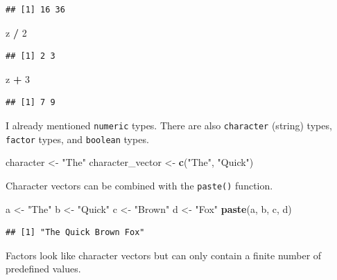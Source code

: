 \documentclass[openany]{book}
\newenvironment{Shaded}{\begin{snugshade}}{\end{snugshade}}
\newcommand{\DecValTok}[1]{\textcolor[rgb]{0.00,0.00,0.81}{#1}}
\newcommand{\KeywordTok}[1]{\textcolor[rgb]{0.13,0.29,0.53}{\textbf{#1}}}
\newcommand{\NormalTok}[1]{#1}
\newcommand{\OperatorTok}[1]{\textcolor[rgb]{0.81,0.36,0.00}{\textbf{#1}}}
\newcommand{\StringTok}[1]{\textcolor[rgb]{0.31,0.60,0.02}{#1}}
\begin{document}
\begin{verbatim}
## [1] 16 36
\end{verbatim}

\begin{Shaded}
\begin{Highlighting}[]
\NormalTok{z }\OperatorTok{/}\StringTok{ }\DecValTok{2}
\end{Highlighting}
\end{Shaded}

\begin{verbatim}
## [1] 2 3
\end{verbatim}

\begin{Shaded}
\begin{Highlighting}[]
\NormalTok{z }\OperatorTok{+}\StringTok{ }\DecValTok{3}
\end{Highlighting}
\end{Shaded}

\begin{verbatim}
## [1] 7 9
\end{verbatim}

I already mentioned \texttt{numeric} types. There are also \texttt{character} (string) types,
\texttt{factor} types, and \texttt{boolean} types.

\begin{Shaded}
\begin{Highlighting}[]
\NormalTok{character <-}\StringTok{ "The"}
\NormalTok{character_vector <-}\StringTok{ }\KeywordTok{c}\NormalTok{(}\StringTok{"The"}\NormalTok{, }\StringTok{"Quick"}\NormalTok{)}
\end{Highlighting}
\end{Shaded}

Character vectors can be combined with the \texttt{paste()} function.

\begin{Shaded}
\begin{Highlighting}[]
\NormalTok{a <-}\StringTok{ "The"}
\NormalTok{b <-}\StringTok{ "Quick"}
\NormalTok{c <-}\StringTok{ "Brown"}
\NormalTok{d <-}\StringTok{ "Fox"}
\KeywordTok{paste}\NormalTok{(a, b, c, d)}
\end{Highlighting}
\end{Shaded}

\begin{verbatim}
## [1] "The Quick Brown Fox"
\end{verbatim}

Factors look like character vectors but can only contain a finite number of predefined
values.
\end{document}
